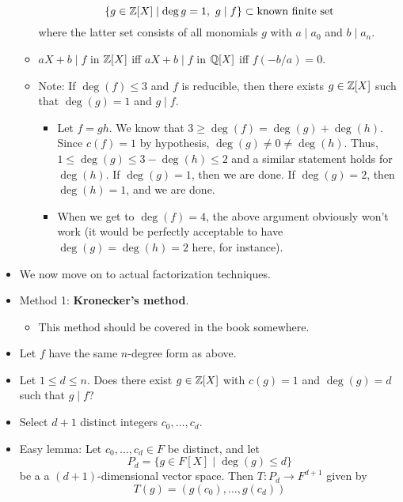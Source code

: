 \documentclass[../notes.tex]{subfiles}
\begin{document}
\begin{itemize}
\begin{itemize}
        \begin{equation*}
            \{g\in\mathbb{Z}[X]\mid \deg g=1,\ g\mid f\} \subset \text{known finite set}
        \end{equation*}
        where the latter set consists of all monomials $g$ with $a\mid a_0$ and $b\mid a_n$.
        \item $aX+b\mid f$ in $\mathbb{Z}[X]$ iff $aX+b\mid f$ in $\mathbb{Q}[X]$ iff $f(-b/a)=0$.
        \item Note: If $\deg(f)\leq 3$ and $f$ is reducible, then there exists $g\in\mathbb{Z}[X]$ such that $\deg(g)=1$ and $g\mid f$.
        \begin{itemize}
            \item Let $f=gh$. We know that $3\geq\deg(f)=\deg(g)+\deg(h)$. Since $c(f)=1$ by hypothesis, $\deg(g)\neq 0\neq\deg(h)$. Thus, $1\leq\deg(g)\leq 3-\deg(h)\leq 2$ and a similar statement holds for $\deg(h)$. If $\deg(g)=1$, then we are done. If $\deg(g)=2$, then $\deg(h)=1$, and we are done.
            \item When we get to $\deg(f)=4$, the above argument obviously won't work (it would be perfectly acceptable to have $\deg(g)=\deg(h)=2$ here, for instance).
        \end{itemize}
    \end{itemize}
    \item We now move on to actual factorization techniques.
    \item Method 1: \textbf{Kronecker's method}.
    \begin{itemize}
        \item This method should be covered in the book somewhere.
    \end{itemize}
    \item Let $f$ have the same $n$-degree form as above.
    \item Let $1\leq d\leq n$. Does there exist $g\in\mathbb{Z}[X]$ with $c(g)=1$ and $\deg(g)=d$ such that $g\mid f$?
    \item Select $d+1$ distinct integers $c_0,\dots,c_d$.
    \item Easy lemma: Let $c_0,\dots,c_d\in F$ be distinct, and let
    \begin{equation*}
        P_d = \{g\in F[X]\mid\deg(g)\leq d\}
    \end{equation*}
    be a a $(d+1)$-dimensional vector space. Then $T:P_d\to F^{d+1}$ given by
    \begin{equation*}
        T(g) = (g(c_0),\dots,g(c_d))
    \end{equation*}

\end{itemize}
\end{document}
